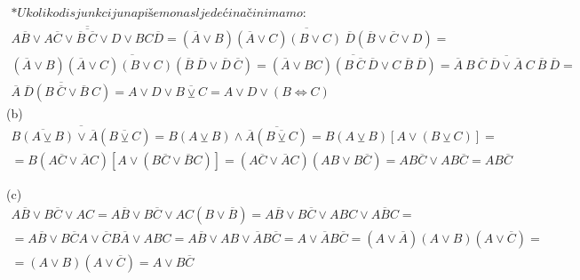 \documentclass[12pt]{article}
\begin{document}
\begin{enumerate}
\begin{align*}
		* Ukoliko disjunkciju napišemo na sljedeći način imamo: \\
		
		\overline{\overline{A\overline{B} \vee A\overline{C} \vee \overline{B}~\overline{C} \vee D  \vee BC\overline{D}}} = \overline{(\overline{A} \vee B)(\overline{A} \vee C)(B \vee C)~\overline{D}(\overline{B} \vee \overline{C} \vee D)} = \\
		
		\overline{(\overline{A} \vee B)(\overline{A} \vee C)(B \vee C)(\overline{B}~\overline{D} \vee \overline{D}~\overline{C})} = \overline{(\overline{A} \vee BC)(B~\overline{C}~\overline{D} \vee C~\overline{B}~\overline{D})} =
		\overline{\overline{A}~B~\overline{C}~\overline{D} \vee \overline{A}~C~\overline{B}~\overline{D}} = \\
		
		\overline{\overline{A}~\overline{D}(B~\overline{C} \vee \overline{B}~C)} =
		A \vee D \vee \overline{B \veebar{} C} = A \vee D \vee (B \Leftrightarrow C)		
		\end{align*}
		\newpage
	(b) \begin{align*}
	
		    \overline{\overline{B(A\veebar{}B)} \vee \overline{A} (\overline{B \veebar{} C})}
		    = B(A \veebar{} B) \wedge \overline{\overline{A} (\overline{B \veebar{} C})}
		    = B(A \veebar{} B) [A \vee(B \veebar{} C)] =  \\
		    
		    = B(A\overline{C} \vee \overline{A}C)[ A \vee (B\overline{C} \vee \overline{B}C)] 
		    = (A\overline{C} \vee \overline{A}C)(AB \vee B\overline{C}) = AB\overline{C} \vee AB\overline{C} = AB\overline{C}
		\end{align*} 
		
		
	(c) \begin{align*}
	
		    A\overline{B} \vee B\overline{C} \vee AC = A\overline{B} \vee B\overline{C} \vee AC
		    (B \vee \overline{B}) = A\overline{B} \vee B\overline{C} \vee ABC \vee A\overline{B}C = \\

		    = A\overline{B} \vee B\overline{C}A \vee \overline{C}B\overline{A} \vee ABC = 
		    A\overline{B} \vee AB \vee \overline{A}B\overline{C} = A \vee \overline{A}B\overline{C}
		    = (A \vee \overline{A})(A \vee B)(A \vee \overline{C}) =
		    \\
		    
		    = (A \vee B)(A \vee \overline{C}) = A \vee B\overline{C}
		\end{align*}
		

\end{enumerate}
\end{document}
